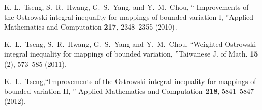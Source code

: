 \documentclass[
11pt,%
tightenlines,%
twoside,%
onecolumn,%
nofloats,%
nobibnotes,%
nofootinbib,%
superscriptaddress,%
noshowpacs,%
centertags]%
{revtex4}
\begin{document}
\begin{thebibliography}{20}
 K. L.~Tseng, S.~R.~Hwang, G.~S.~Yang, and Y.~M.~Chou, \textquotedblleft
Improvements of the Ostrowski integral inequality for mappings of
bounded variation I, \textquotedblright Applied Mathematics and
Computation \textbf{217}, 2348--2355 (2010).

 K.~L.~Tseng, S.~R.~Hwang, G.~S.~Yang and Y.~M.~Chou,
\textquotedblleft Weighted Ostrowski integral inequality for mappings of bounded variation,
\textquotedblright Taiwanese J. of Math. \textbf{15} (2), 573--585 (2011).

 K.~L.~Tseng,\textquotedblleft Improvements of the Ostrowski integral
inequality for mappings of bounded variation II, \textquotedblright
Applied Mathematics and Computation  \textbf{218}, 5841--5847
(2012).
\end{thebibliography}
\end{document}
